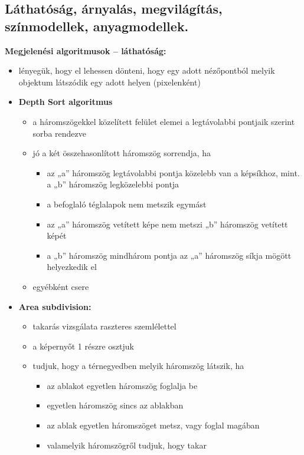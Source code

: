 \subsection{Láthatóság, árnyalás, megvilágítás, színmodellek, anyagmodellek.}

\textbf{Megjelenési algoritmusok – láthatóság:}
\begin{itemize}
    \item lényegük, hogy el lehessen dönteni, hogy egy adott nézőpontból melyik objektum látszódik egy adott helyen (pixelenként)
    \item \textbf{Depth Sort algoritmus}
    \begin{itemize}
        \item a háromszögekkel közelített felület elemei a legtávolabbi pontjaik szerint sorba rendezve
        \item jó a két összehasonlított háromszög sorrendja, ha
        \begin{itemize}
            \item az „a” háromszög legtávolabbi pontja közelebb van a képsíkhoz, mint. a „b” háromszög legközelebbi pontja
            \item a befoglaló téglalapok nem metszik egymást
            \item az „a” háromszög vetített képe nem metszi „b” háromszög vetített képét
            \item a „b” háromszög mindhárom pontja az „a” háromszög síkja mögött helyezkedik el
        \end{itemize}
        \item egyébként csere
    \end{itemize}
    \item \textbf{Area subdivision:}
    \begin{itemize}
        \item takarás vizsgálata raszteres szemlélettel
        \item a képernyőt 1 részre osztjuk
        \item tudjuk, hogy a térnegyedben melyik háromszög látszik, ha
        \begin{itemize}
            \item az ablakot egyetlen háromszög foglalja be
            \item egyetlen háromszög sincs az ablakban
            \item az ablak egyetlen háromszöget metsz, vagy foglal magában
            \item valamelyik háromszögről tudjuk, hogy takar

\end{itemize}
\end{itemize}
\end{itemize}
